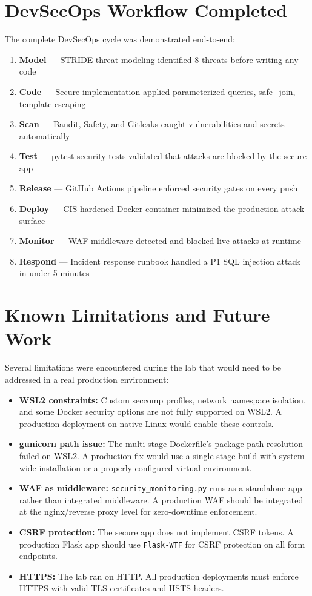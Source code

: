 \documentclass[12pt,a4paper]{report}
\begin{document}
\section{DevSecOps Workflow Completed}

The complete DevSecOps cycle was demonstrated end-to-end:

\begin{enumerate}[leftmargin=1.5cm]
  \item \textbf{Model} — STRIDE threat modeling identified 8 threats before writing any code
  \item \textbf{Code} — Secure implementation applied parameterized queries, safe\_join, template escaping
  \item \textbf{Scan} — Bandit, Safety, and Gitleaks caught vulnerabilities and secrets automatically
  \item \textbf{Test} — pytest security tests validated that attacks are blocked by the secure app
  \item \textbf{Release} — GitHub Actions pipeline enforced security gates on every push
  \item \textbf{Deploy} — CIS-hardened Docker container minimized the production attack surface
  \item \textbf{Monitor} — WAF middleware detected and blocked live attacks at runtime
  \item \textbf{Respond} — Incident response runbook handled a P1 SQL injection attack in under 5 minutes
\end{enumerate}

\section{Known Limitations and Future Work}

Several limitations were encountered during the lab that would need to be addressed in a real production environment:

\begin{itemize}[leftmargin=1.5cm]
  \item \textbf{WSL2 constraints:} Custom seccomp profiles, network namespace isolation, and some Docker security options are not fully supported on WSL2. A production deployment on native Linux would enable these controls.
  \item \textbf{gunicorn path issue:} The multi-stage Dockerfile's package path resolution failed on WSL2. A production fix would use a single-stage build with system-wide installation or a properly configured virtual environment.
  \item \textbf{WAF as middleware:} \texttt{security\_monitoring.py} runs as a standalone app rather than integrated middleware. A production WAF should be integrated at the nginx/reverse proxy level for zero-downtime enforcement.
  \item \textbf{CSRF protection:} The secure app does not implement CSRF tokens. A production Flask app should use \texttt{Flask-WTF} for CSRF protection on all form endpoints.
  \item \textbf{HTTPS:} The lab ran on HTTP. All production deployments must enforce HTTPS with valid TLS certificates and HSTS headers.
\end{itemize}
\end{document}

